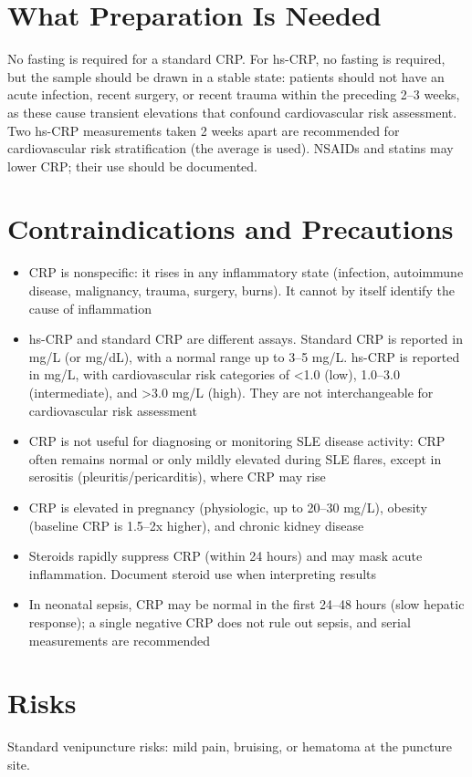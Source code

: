 \section*{What Preparation Is Needed}
No fasting is required for a standard CRP. For hs-CRP, no fasting is required, but the sample should be drawn in a stable state: patients should not have an acute infection, recent surgery, or recent trauma within the preceding 2--3 weeks, as these cause transient elevations that confound cardiovascular risk assessment. Two hs-CRP measurements taken 2 weeks apart are recommended for cardiovascular risk stratification (the average is used). NSAIDs and statins may lower CRP; their use should be documented.

\section*{Contraindications and Precautions}
\begin{itemize}
  \item CRP is nonspecific: it rises in any inflammatory state (infection, autoimmune disease, malignancy, trauma, surgery, burns). It cannot by itself identify the cause of inflammation
  \item hs-CRP and standard CRP are different assays. Standard CRP is reported in mg/L (or mg/dL), with a normal range up to 3--5 mg/L. hs-CRP is reported in mg/L, with cardiovascular risk categories of <1.0 (low), 1.0--3.0 (intermediate), and >3.0 mg/L (high). They are not interchangeable for cardiovascular risk assessment
  \item CRP is not useful for diagnosing or monitoring SLE disease activity: CRP often remains normal or only mildly elevated during SLE flares, except in serositis (pleuritis/pericarditis), where CRP may rise
  \item CRP is elevated in pregnancy (physiologic, up to 20--30 mg/L), obesity (baseline CRP is 1.5--2x higher), and chronic kidney disease
  \item Steroids rapidly suppress CRP (within 24 hours) and may mask acute inflammation. Document steroid use when interpreting results
  \item In neonatal sepsis, CRP may be normal in the first 24--48 hours (slow hepatic response); a single negative CRP does not rule out sepsis, and serial measurements are recommended
\end{itemize}
\section*{Risks}
Standard venipuncture risks: mild pain, bruising, or hematoma at the puncture site.

